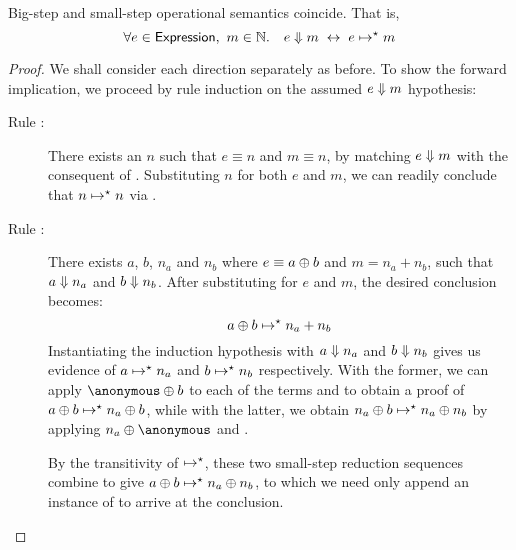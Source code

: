 \begin{theorem}\label{thm:big-small}
Big-step and small-step operational semantics coincide. That is,
\[
	\forall e \in \textsf{Expression},\ m \in \mathbb{N}.\quad
		e \Downarrow m \;\leftrightarrow\; e \mapsto^\star m
\]
\end{theorem}
\begin{proof}
We shall consider each direction separately as before. To show the forward
implication, we proceed by rule induction on the assumed $e \Downarrow m$
hypothesis:
\begin{description}
\item[Rule :]%
There exists an $n$ such that $e \equiv n$ and $m \equiv n$, by matching $e
\Downarrow m$ with the consequent of . Substituting $n$ for
both $e$ and $m$, we can readily conclude that $n \mapsto^\star n$ via
.
\item[Rule :]%
There exists $a$, $b$, $n_a$ and $n_b$ where $e \equiv a \oplus b$ and $m
= n_a + n_b$, such that $a \Downarrow n_a$ and $b \Downarrow n_b$. After
substituting for $e$ and $m$, the desired conclusion becomes:
\[
	a \oplus b \mapsto^\star n_a + n_b
\]
Instantiating the induction hypothesis with $a \Downarrow n_a$ and $b
\Downarrow n_b$ gives us evidence of $a \mapsto^\star n_a$ and $b
\mapsto^\star n_b$ respectively. With the former, we can apply $\anonymous
\Add b$ to each of the terms and  to obtain a proof of
$a \oplus b \mapsto^\star n_a \oplus b$, while with the latter, we obtain
$n_a \oplus b \mapsto^\star n_a \oplus n_b$ by applying $n_a \Add
\anonymous$ and .

By the transitivity of $\mapsto^\star$, these two small-step reduction
sequences combine to give $a \oplus b \mapsto^\star n_a \oplus n_b$, to
which we need only append an instance of  to arrive at
the conclusion.
\end{description}



\end{proof}
